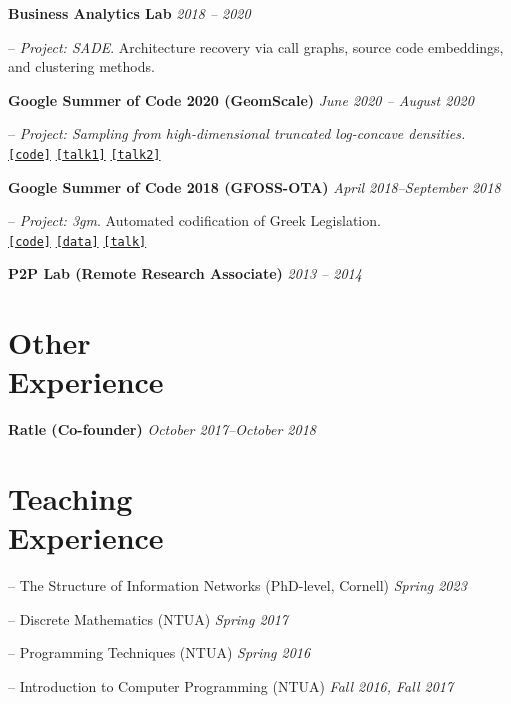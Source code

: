 \documentclass[margin]{res}
\newcommand{\specialurl}[2]{\href {#2} {\texttt{[#1]}}}
\newcommand{\code}[1]{\specialurl {code} {#1}}
\newcommand{\data}[1]{\specialurl {data} {#1}}
\newcommand{\talk}[1]{\specialurl {talk} {#1}}
\begin{document}
\begin{resume}
\textbf{Business Analytics Lab} \hfill \emph{2018 -- 2020}
\begin{compactitem}
\item[--] \emph{Project: SADE}. Architecture recovery via call graphs, source code embeddings, and clustering methods.
\end{compactitem}

\textbf{Google Summer of Code 2020 (GeomScale)}  \hfill \emph{June 2020 -- August 2020}
\begin{compactitem}
\item[--] \emph{Project: Sampling from high-dimensional truncated log-concave densities.} \\ \code{https://GeomScale/volesti} \specialurl{talk1}{https://www.youtube.com/watch?v=P7YfC8Nn6sY} \specialurl{talk2}{https://www.cs.utah.edu/~jeffp/WaGoML/index.html}
\end{compactitem}

\textbf{Google Summer of Code 2018 (GFOSS-OTA)}  \hfill {\emph{April 2018--September 2018}}
\begin{compactitem}
\item[--] \emph{Project: 3gm}. Automated codification of Greek Legislation. \\ \code{https://github.com/eellak/gsoc2018-3gm} \data{https://archive.org/details/greekgovernmentgazette} \talk{https://www.youtube.com/watch?v=_UIGsy85Ehw}
\end{compactitem}



\textbf{P2P Lab (Remote Research Associate)} \hfill \emph{2013 -- 2014}

 
\section{Other \\ Experience}

\textbf{Ratle (Co-founder)} \hfill {\emph{October 2017--October 2018}}

\smallskip

\section{Teaching \\ Experience} 
\begin{compactitem}
	\item[--] The Structure of Information Networks (PhD-level, Cornell) \hfill \emph{Spring 2023} 
    \item[--] Discrete Mathematics (NTUA) \hfill \emph{Spring 2017}
    \item[--] Programming Techniques (NTUA) \hfill \emph{Spring 2016}
    \item[--] Introduction to Computer Programming (NTUA) \hfill \emph{Fall 2016, Fall 2017}
\end{compactitem}



\end{resume}
\end{document}
